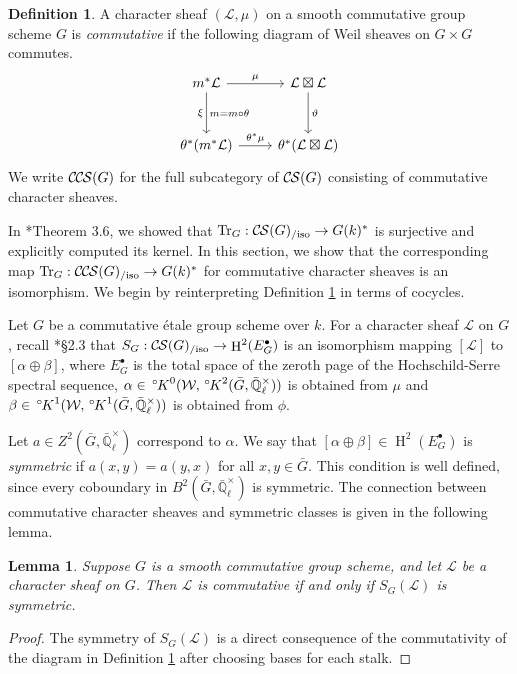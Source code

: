 \documentclass[10pt]{amsart}
\theoremstyle{plain}
\newtheorem{lemma}[theorem]{Lemma}
\theoremstyle{definition}
\newtheorem{definition}[theorem]{Definition}
\newcommand{\EE}{\mathbb{\bar Q}_\ell}
\newcommand{\EEx}{\EE^\times}
\newcommand{\Weil}[1]{\mathcal{W}_{#1}}
\DeclareMathOperator{\Hh}{H}
\DeclareMathOperator{\Tr}{Tr}
\newcommand{\TrFrob}[1]{\Tr_{#1}}
\newcommand{\cs}[1]{{\mathcal{#1}}}
\newcommand{\CS}{{\mathcal{C\hskip-0.8pt S}}}
\newcommand{\CCS}{{\mathcal{C\hskip-.8pt C\hskip-0.8pt S}}}
\newcommand{\CSiso}[1]{\CS(#1)_{/\text{iso}}}
\newcommand{\CCSiso}[1]{\CCS(#1)_{/\text{iso}}}
\newcommand{\bG}{\bar{G}}
\newcommand{\oK}{{\,^\circ \hskip-1pt K}}
\begin{document}
\begin{definition}\label{def:CCScom}
A character sheaf $(\cs{L}, \mu)$ on a smooth commutative group scheme $G$ is \emph{commutative}
if the following diagram of Weil sheaves on $G \times G$ commutes.
  \[
  \begin{tikzcd}[row sep=30]
   m^*\cs{L} \arrow{d}[swap]{\xi}{m= m\circ\theta} \arrow{r}{\mu} & \cs{L}\boxtimes\cs{L} \arrow{d}{\vartheta}\\
   \theta^*(m^*\cs{L}) \arrow{r}{{\theta}^*\mu} &  \theta^*(\cs{L}\boxtimes\cs{L})
  \end{tikzcd}
  \]
We write $\CCS(G)$ for the full subcategory of $\CS(G)$ consisting of commutative character sheaves.
 \end{definition}

In \cite{cunningham-roe:13a}*{Theorem 3.6}, we showed that $\TrFrob{G} : \CSiso{G} \to G(k)^*$ is surjective and
explicitly computed its kernel.  In this section, we show that the corresponding map
$\TrFrob{G} : \CCSiso{G} \to G(k)^*$ for commutative character sheaves is an isomorphism.
We begin by reinterpreting Definition \ref{def:CCScom} in terms of cocycles.

Let $G$ be a commutative \'etale group scheme over $k$. For a character sheaf $\cs{L}$ on $G$, recall
\cite{cunningham-roe:13a}*{\S 2.3} that $S_G : \CSiso{G} \to \Hh^2(E_G^\bullet)$ is an isomorphism mapping
$[\cs{L}]$ to $[\alpha \oplus \beta]$, where $E_G^\bullet$ is the total space of the zeroth page
of the Hochschild-Serre spectral sequence, $\alpha \in \oK^0(\Weil{}, \oK^2(\bG, \EEx))$ is obtained from $\mu$ and
$\beta \in \oK^1(\Weil{}, \oK^1(\bG, \EEx))$ is obtained from $\phi$.

Let $a \in Z^2(\bG, \EEx)$ correspond to $\alpha$.  We say that $[\alpha \oplus \beta] \in \Hh^2(E_G^\bullet)$
is \emph{symmetric} if $a(x,y) = a(y,x)$ for all $x,y \in \bG$.  This condition is well defined, since every
coboundary in $B^2(\bG, \EEx)$ is symmetric.  The connection between commutative character sheaves
and symmetric classes is given in the following lemma.

\begin{lemma} \label{lem:symccslink}
Suppose $G$ is a smooth commutative group scheme, and let $\cs{L}$ be a character sheaf on $G$.
Then $\cs{L}$ is commutative if and only if $S_G(\cs{L})$ is symmetric.
\end{lemma}
\begin{proof}
The symmetry of $S_G(\cs{L})$ is a direct consequence of the commutativity of the diagram in Definition \ref{def:CCScom}
after choosing bases for each stalk.
\end{proof}
\end{document}
